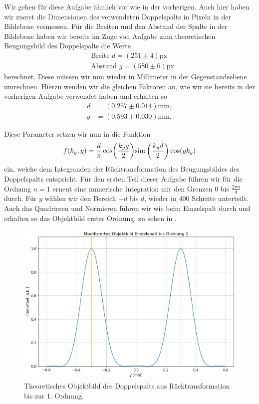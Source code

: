 Wir gehen für diese Aufgabe ähnlich vor wie in der vorherigen. Auch hier haben wir zuerst die Dimensionen des verwendeten Doppelspalts in Pixeln in der Bildebene vermessen. Für die Breiten und den Abstand der Spalte in der Bildebene haben wir bereits im Zuge von Aufgabe zum theoretischen Beugungsbild des Doppelspalts die Werte
\begin{align}
  &\text{Breite } d = (251 \pm 4) \mathrm{px}\\[1em]
  &\text{Abstand } g = (580 \pm 6) \mathrm{px}
\end{align}
berechnet. Diese müssen wir nun wieder in Millimeter in der Gegenstandsebene umrechnen. Hierzu wenden wir die gleichen Faktoren an, wie wir sie bereits in der vorherigen Aufgabe verwendet haben und erhalten so
\begin{align}
  d &= (0.257 \pm 0.014)\si{\milli\meter}, \\[1em]
  g &= (0.593 \pm 0.030)\si{\milli\meter}.
\end{align}

Diese Parameter setzen wir nun in die Funktion
\begin{align}
  f(k_y,y) = \frac{d}{\pi} \cos(\frac{k_y g}{2}) \mathrm{sinc}\qty(\frac{k_y d}{2}) \cos(y k_y)
\end{align}
ein, welche dem Integranden der Rücktransformation des Beugungsbildes des Doppelspalts entspricht. Für den ersten Teil dieser Aufgabe führen wir für die Ordnung $n = 1$ erneut eine numerische Integration mit den Grenzen $0$ bis $\frac{2\pi n}{d}$ durch. Für $y$ wählen wir den Bereich $-d$ bis $d$, wieder in $400$ Schritte unterteilt. Auch das Quadrieren und Normieren führen wir wie beim Einzelspalt durch und erhalten so das Objektbild erster Ordnung, zu sehen in .

\begin{figure}[H]
  \centering
  \includegraphics[width=.9\textwidth]{files/plots/5/ds_theorie_objektbild_ord1.png}
  \caption{Theoretisches Objektbild des Doppelspalts aus Rücktransformation bis zur 1. Ordnung.}
  \label{fig:ds_theorie_objektbild_ord1}
\end{figure}

